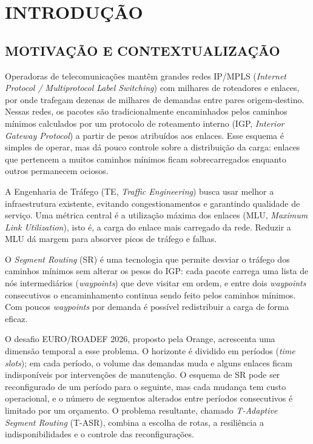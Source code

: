 \chapter{INTRODUÇÃO}
\label{cap:introducao}

\section{\uppercase{Motivação e Contextualização}}

Operadoras de telecomunicações mantêm grandes redes IP/MPLS (\textit{Internet Protocol / Multiprotocol Label Switching}) com milhares de roteadores e enlaces, por onde trafegam dezenas de milhares de demandas entre pares origem-destino. Nessas redes, os pacotes são tradicionalmente encaminhados pelos caminhos mínimos calculados por um protocolo de roteamento interno (IGP, \textit{Interior Gateway Protocol}) a partir de pesos atribuídos aos enlaces. Esse esquema é simples de operar, mas dá pouco controle sobre a distribuição da carga: enlaces que pertencem a muitos caminhos mínimos ficam sobrecarregados enquanto outros permanecem ociosos.

A Engenharia de Tráfego (TE, \textit{Traffic Engineering}) busca usar melhor a infraestrutura existente, evitando congestionamentos e garantindo qualidade de serviço. Uma métrica central é a utilização máxima dos enlaces (MLU, \textit{Maximum Link Utilization}), isto é, a carga do enlace mais carregado da rede. Reduzir a MLU dá margem para absorver picos de tráfego e falhas.

O \textit{Segment Routing} (SR) é uma tecnologia que permite desviar o tráfego dos caminhos mínimos sem alterar os pesos do IGP: cada pacote carrega uma lista de nós intermediários (\textit{waypoints}) que deve visitar em ordem, e entre dois \textit{waypoints} consecutivos o encaminhamento continua sendo feito pelos caminhos mínimos. Com poucos \textit{waypoints} por demanda é possível redistribuir a carga de forma eficaz.

O desafio EURO/ROADEF 2026, proposto pela Orange, acrescenta uma dimensão temporal a esse problema. O horizonte é dividido em períodos (\textit{time slots}); em cada período, o volume das demandas muda e alguns enlaces ficam indisponíveis por intervenções de manutenção. O esquema de SR pode ser reconfigurado de um período para o seguinte, mas cada mudança tem custo operacional, e o número de segmentos alterados entre períodos consecutivos é limitado por um orçamento. O problema resultante, chamado \textit{T-Adaptive Segment Routing} (T-ASR), combina a escolha de rotas, a resiliência a indisponibilidades e o controle das reconfigurações.

